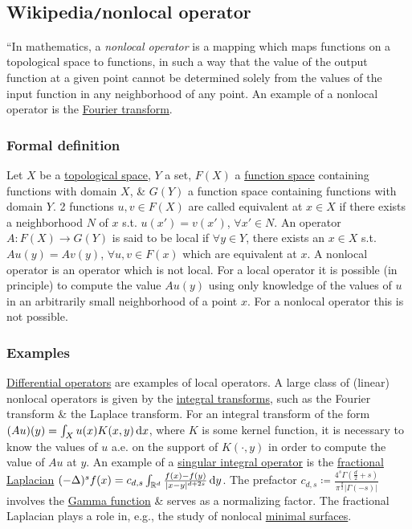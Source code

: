 \documentclass{article}
\begin{document}

\subsection{Wikipedia{\tt/}nonlocal operator}
``In mathematics, a {\it nonlocal operator} is a mapping which maps functions on a topological space to functions, in such a way that the value of the output function at a given point cannot be determined solely from the values of the input function in any neighborhood of any point. An example of a nonlocal operator is the \href{https://en.wikipedia.org/wiki/Fourier_transform}{Fourier transform}.

\subsubsection{Formal definition}
Let $X$ be a \href{https://en.wikipedia.org/wiki/Topological_space}{topological space}, $Y$ a set, $F(X)$ a \href{https://en.wikipedia.org/wiki/Function_space}{function space} containing functions with domain $X$, \& $G(Y)$ a function space containing functions with domain $Y$. 2 functions $u,v\in F(X)$ are called equivalent at $x\in X$ if there exists a neighborhood $N$ of $x$ s.t. $u(x') = v(x')$, $\forall x'\in N$. An operator $A:F(X)\to G(Y)$ is said to be local if $\forall y\in Y$, there exists an $x\in X$ s.t. $Au(y) = Av(y)$, $\forall u,v\in F(x)$ which are equivalent at $x$. A nonlocal operator is an operator which is not local. For a local operator it is possible (in principle) to compute the value $Au(y)$ using only knowledge of the values of $u$ in an arbitrarily small neighborhood of a point $x$. For a nonlocal operator this is not possible.

\subsubsection{Examples}
\href{https://en.wikipedia.org/wiki/Differential_operator}{Differential operators} are examples of local operators. A large class of (linear) nonlocal operators is given by the \href{https://en.wikipedia.org/wiki/Integral_transform}{integral transforms}, such as the Fourier transform \& the Laplace transform. For an integral transform of the form $(Au)(y) = \int_X u(x)K(x,y)\,{\rm d}x$, where $K$ is some kernel function, it is necessary to know the values of $u$ a.e. on the support of $K(\cdot,y)$ in order to compute the value of $Au$ at $y$. An example of a \href{https://en.wikipedia.org/wiki/Singular_integral_operator}{singular integral operator} is the \href{https://en.wikipedia.org/wiki/Fractional_Laplacian}{fractional Laplacian} $(-\Delta)^sf(x) = c_{d,s}\int_{\mathbb{R}^d} \frac{f(x) - f(y)}{|x - y|^{d + 2s}}\,{\rm d}y$. The prefactor $c_{d,s}\coloneqq\frac{4^s\Gamma(\frac{d}{2} + s)}{\pi^{\frac{d}{2}}|\Gamma(-s)|}$ involves the \href{https://en.wikipedia.org/wiki/Gamma_function}{Gamma function} \& serves as a normalizing factor. The fractional Laplacian plays a role in, e.g., the study of nonlocal \href{https://en.wikipedia.org/wiki/Minimal_surfaces}{minimal surfaces}.
\end{document}
